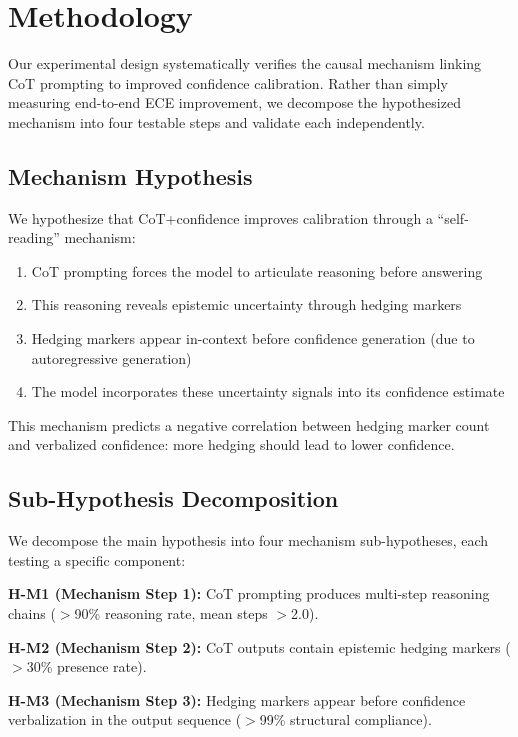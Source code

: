 \section{Methodology}

Our experimental design systematically verifies the causal mechanism linking CoT prompting to improved confidence calibration. Rather than simply measuring end-to-end ECE improvement, we decompose the hypothesized mechanism into four testable steps and validate each independently.

\subsection{Mechanism Hypothesis}

We hypothesize that CoT+confidence improves calibration through a ``self-reading'' mechanism:

\begin{enumerate}
    \item CoT prompting forces the model to articulate reasoning before answering
    \item This reasoning reveals epistemic uncertainty through hedging markers
    \item Hedging markers appear in-context before confidence generation (due to autoregressive generation)
    \item The model incorporates these uncertainty signals into its confidence estimate
\end{enumerate}

This mechanism predicts a negative correlation between hedging marker count and verbalized confidence: more hedging should lead to lower confidence.

\subsection{Sub-Hypothesis Decomposition}

We decompose the main hypothesis into four mechanism sub-hypotheses, each testing a specific component:

\textbf{H-M1 (Mechanism Step 1):} CoT prompting produces multi-step reasoning chains ($>$90\% reasoning rate, mean steps $>$2.0).

\textbf{H-M2 (Mechanism Step 2):} CoT outputs contain epistemic hedging markers ($>$30\% presence rate).

\textbf{H-M3 (Mechanism Step 3):} Hedging markers appear before confidence verbalization in the output sequence ($>$99\% structural compliance).

